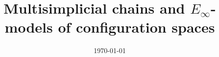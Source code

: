 \documentclass{amsart}
\title[Short title]{Multisimplicial chains and $E_\infty$-models of configuration spaces}
\date{\today}
\begin{document}
	
	\maketitle
	\tableofcontents
	
	
	
	
	
	\sloppy
	\printbibliography
	\todos
%	
\end{document}
